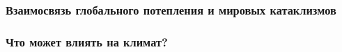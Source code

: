 \documentclass[a4paper,12pt]{ncc}
\begin{document}
\subsubsection[Взаимосвязь глобального потепления и мировых катаклизмов]{Взаимосвязь глобального потепления и мировых катаклизмов}
\label{sec:subsubsection}

\begin{figure}[!h]
\end{figure}

\subsubsection[Что может влиять на климат?]{Что может влиять на климат?}
\label{sec:subsubsection}
 
\end{document}
